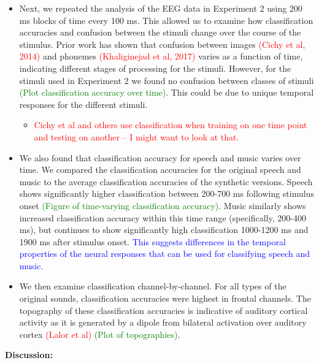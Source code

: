 \documentclass[11pt]{article}
\begin{document}
\begin{itemize}
\item Next, we repeated the analysis of the EEG data in Experiment 2 using 200 ms blocks of time every 100 ms.  This allowed us to examine how classification accuracies and confusion between the stimuli change over the course of the stimulus.  Prior work has shown that confusion between images \textcolor{red}{(Cichy et al, 2014)} and phonemes \textcolor{red}{(Khaliginejad et al, 2017)} varies as a function of time, indicating different stages of processing for the stimuli.  However, for the stimuli used in Experiment 2 we found no confusion between classes of stimuli \textcolor{green}{(Plot classification accuracy over time)}.  This could be due to unique temporal responses for the different stimuli.
    \begin{itemize}
    \item \textcolor{red}{Cichy et al and others use classification when training on one time point and testing on another -- I might want to look at that.}
    \end{itemize}
\item We also found that classification accuracy for speech and music varies over time.  We compared the classification accuracies for the original speech and music to the average classification accuracies of the synthetic versions.  Speech shows significantly higher classification between 200-700 ms following stimulus onset \textcolor{green}{(Figure of time-varying classification accuracy)}.  Music similarly shows increased classification accuracy within this time range (specifically, 200-400 ms), but continues to show significantly high classification 1000-1200 ms and 1900 ms after stimulus onset.  \textcolor{blue}{This suggests differences in the temporal properties of the neural responses that can be used for classifying speech and music.}
\item We then examine classification channel-by-channel.  For all types of the original sounds, classification accuracies were highest in frontal channels.  The topography of these classification accuracies is indicative of auditory cortical activity as it is generated by a dipole from bilateral activation over auditory cortex \textcolor{red}{(Lalor et al)} \textcolor{green}{(Plot of topographies)}.
\end{itemize}

\textbf{Discussion:}
\end{document}
